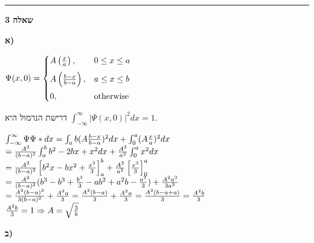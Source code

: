 \documentclass[14pt]{extarticle}
\makeatletter
\newenvironment{lefteqs}{%
    \begin{english}%
    \begin{flushleft}%
    \renewcommand{\arraystretch}{1.3}%
    $\begin{array}{@{}l@{}}%
}{%
    \end{array}$%
    \end{flushleft}%
    \end{english}%
}
\makeatother
\begin{document}
\vspace{3em}
\hrule
\vspace{2em}

\textbf{\large שאלה 3}

\textbf{א)}
\begin{lefteqs}
    \Psi(x,0) =
    \begin{cases}
        A\left(\frac{x}{a}\right),         & 0 \le x \le a    \\[6pt]
        A\left(\frac{b - x}{b - a}\right), & a \le x \le b    \\[6pt]
        0,                                 & \text{otherwise}
    \end{cases}
\end{lefteqs}
דרישת הנרמול היא  $\int_{-\infty}^{\infty} |\Psi(x,0)|^2 dx = 1$.
\begin{lefteqs}
    \int_{-\infty}^{\infty} \Psi \Psi* dx = \int_{a}{b} (A\frac{b-x}{b-a})^2 dx + \int_{0}^{a} (A\frac{x}{a})^2 dx \\
    = \frac{A^2}{(b-a)^2}\int_{a}^{b} b^2-2bx+x^2 dx + \frac{A^2}{a^2} \int_{0}^{a} x^2 dx \\
    = \frac{A^2}{(b-a)^2}\left[ b^2x-bx^2+\frac{x^3}{3} \right]_{a}^{b} + \frac{A^2}{a^2} \left[\frac{x^3}{3} \right]_{0}^{a} \\
    = \frac{A^2}{(b-a)^2} (b^3 - b^3 + \frac{b^3}{3} - ab^2 + a^2b - \frac{a^3}{3}) +  \frac{A^2 a^3}{3a^2}  \\
    = \frac{A^2(b-a)^3}{3(b-a)^2} + \frac{A^2 a}{3} = \frac{A^2 (b-a)}{3} + \frac{A^2 a}{3} = \frac{A^2 (b-a+a)}{3} = \frac{A^2 b}{3} \\
    \frac{A^2 b}{3} = 1 \Rightarrow A = \sqrt{\frac{3}{b}}
\end{lefteqs}

\textbf{ב)}

\end{document}
